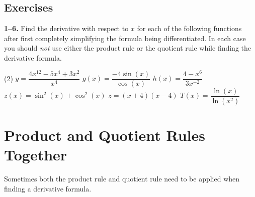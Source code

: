 \documentclass[10pt,oneside,]{book}
\theoremstyle{plain}
\theoremstyle{definition}
\numberwithin{equation}{section}
\newcommand{\fe}[2]{#1\mathopen{}\left(#2\right)\mathclose{}}
\begin{document}
\subsection[Exercises]{Exercises}\label{exercises-39}
\textbf{1--6. }\hypertarget{exercisegroup-80}{\null}Find the derivative with respect to \(x\) for each of the following functions after first completely simplifying the formula being differentiated.  In each case you should \emph{not} use either the product rule or the quotient rule while finding the derivative formula.%
\par
\begin{exercisegroup}(2)
\exercise[1.]\hypertarget{exercise-386}{\null}\(y=\dfrac{4x^{12}-5x^4+3x^2}{x^4}\)%
\exercise[2.]\hypertarget{exercise-387}{\null}\(\fe{g}{x}=\dfrac{-4\fe{\sin}{x}}{\fe{\cos}{x}}\)%
\exercise[3.]\hypertarget{exercise-388}{\null}\(\fe{h}{x}=\dfrac{4-x^6}{3x^{-2}}\)%
\exercise[4.]\hypertarget{exercise-389}{\null}\(\fe{z}{x}=\fe{\sin^2}{x}+\fe{\cos^2}{x}\)%
\exercise[5.]\hypertarget{exercise-390}{\null}\(z=(x+4)(x-4)\)%
\exercise[6.]\hypertarget{exercise-391}{\null}\(\fe{T}{x}=\dfrac{\fe{\ln}{x}}{\fe{\ln}{x^2}}\)%
\end{exercisegroup}
\par\smallskip\noindent
\typeout{************************************************}
\typeout{************************************************}
\section[Product, Quotient Rules Together]{Product and Quotient Rules Together}\label{section-product-and-quotient-together}
Sometimes both the product rule and quotient rule need to be applied when finding a derivative formula.%
\typeout{************************************************}
\typeout{************************************************}
\end{document}
